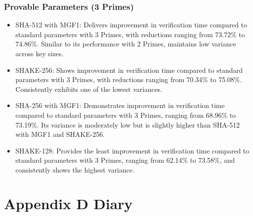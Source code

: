 \documentclass[]{final_report}
\theoremstyle{definition}
\begin{document}
\subsection*{Provable Parameters (3 Primes)}
\begin{itemize}
\item SHA-512 with MGF1: Delivers improvement in verification time compared to standard parameters with 3 Primes, with reductions ranging from 73.72\% to 74.86\%. Similar to its performance with 2 Primes, maintains low variance across key sizes.
\item SHAKE-256: Shows improvement in verification time compared to standard parameters with 3 Primes, with reductions ranging from 70.34\% to 75.08\%. Consistently exhibits one of the lowest variances.
\item SHA-256 with MGF1: Demonstrates improvement in verification time compared to standard parameters with 3 Primes, ranging from 68.96\% to 73.19\%. Its variance is moderately low but is slightly higher than SHA-512 with MGF1 and SHAKE-256.
\item SHAKE-128: Provides the least improvement in verification time compared to standard parameters with 3 Primes, ranging from 62.14\% to 73.58\%, and consistently shows the highest variance.
\end{itemize}

\chapter{Appendix D Diary}
\end{document}
